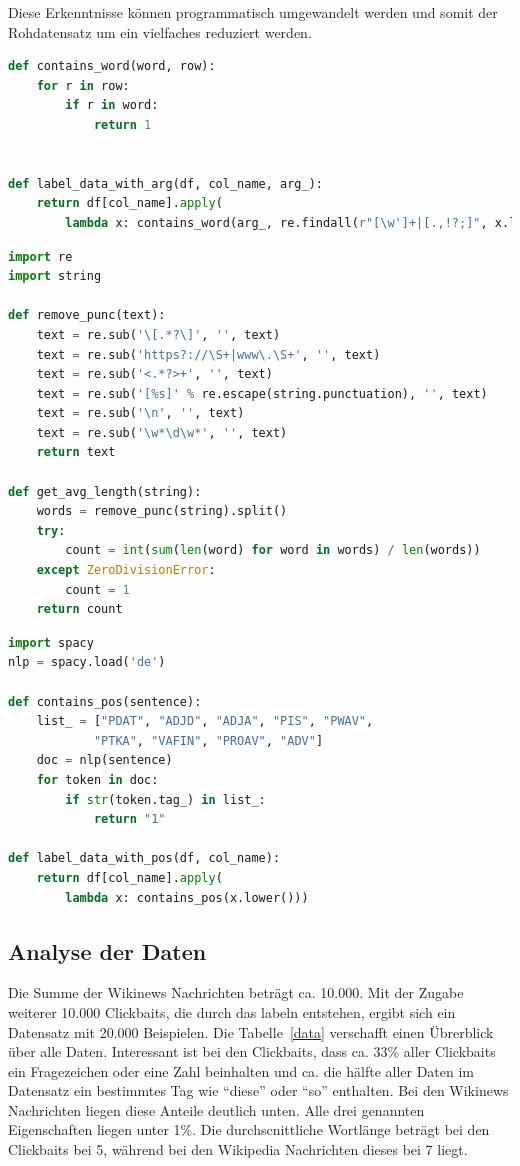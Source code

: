 Diese Erkenntnisse können programmatisch umgewandelt werden und somit der Rohdatensatz um ein vielfaches reduziert werden.


\begin{lstlisting}[language=Python,caption=Funktion welches ein Dataframe je nach Argumenten labelt]
def contains_word(word, row):
    for r in row:
        if r in word:
            return 1


def label_data_with_arg(df, col_name, arg_):
    return df[col_name].apply(
        lambda x: contains_word(arg_, re.findall(r"[\w']+|[.,!?;]", x.lower())))
\end{lstlisting}\label{Label1}

\begin{lstlisting}[language=Python,caption=Funktionen für durchschnittliche Wortlänge und Interpunktion]
import re
import string

def remove_punc(text):
    text = re.sub('\[.*?\]', '', text)
    text = re.sub('https?://\S+|www\.\S+', '', text)
    text = re.sub('<.*?>+', '', text)
    text = re.sub('[%s]' % re.escape(string.punctuation), '', text)
    text = re.sub('\n', '', text)
    text = re.sub('\w*\d\w*', '', text)
    return text

def get_avg_length(string):
    words = remove_punc(string).split()
    try:
        count = int(sum(len(word) for word in words) / len(words))
    except ZeroDivisionError:
        count = 1
    return count
\end{lstlisting}\label{Label2}

\begin{lstlisting}[language=Python,caption=Tagger Funktion]
import spacy
nlp = spacy.load('de')

def contains_pos(sentence):
    list_ = ["PDAT", "ADJD", "ADJA", "PIS", "PWAV", 
            "PTKA", "VAFIN", "PROAV", "ADV"]
    doc = nlp(sentence)
    for token in doc:
        if str(token.tag_) in list_:
            return "1"

def label_data_with_pos(df, col_name):
    return df[col_name].apply(
        lambda x: contains_pos(x.lower()))
\end{lstlisting}\label{Label3}


\subsection{Analyse der Daten}
Die Summe der Wikinews Nachrichten beträgt ca. 10.000. Mit der Zugabe weiterer 10.000 Clickbaits, die durch das labeln entstehen, ergibt sich ein Datensatz mit 20.000 Beispielen. Die Tabelle~\ref{data} verschafft einen Übrerblick über alle Daten. Interessant ist bei den Clickbaits, dass ca. 33\% aller Clickbaits ein Fragezeichen oder eine Zahl beinhalten und ca. die hälfte aller Daten im Datensatz ein bestimmtes Tag wie \enquote{diese} oder \enquote{so} enthalten. Bei den Wikinews Nachrichten liegen diese Anteile deutlich unten. Alle drei genannten Eigenschaften liegen unter 1\%. Die durchscnittliche Wortlänge beträgt bei den Clickbaits bei 5, während bei den Wikipedia Nachrichten dieses bei 7 liegt.

